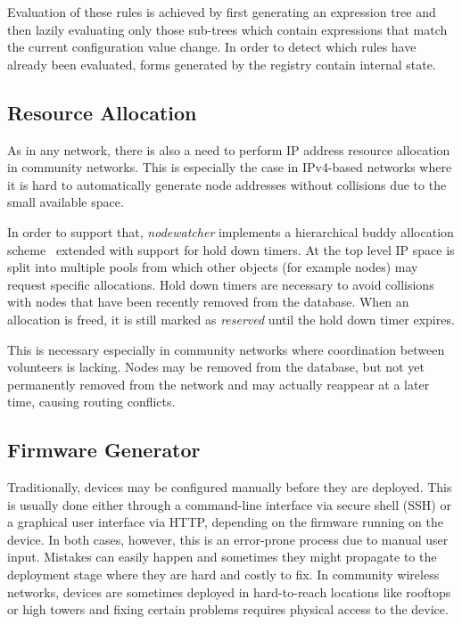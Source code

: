 \documentclass[5p,sort&compress]{elsarticle}
\newcommand{\nodewatcher}{\textit{nodewatcher}}
\begin{document}
Evaluation of these rules is achieved by first generating an expression tree and then lazily evaluating only those sub-trees which contain expressions that match the current configuration value change.
In order to detect which rules have already been evaluated, forms generated by the registry contain internal state.

\subsection{Resource Allocation}

As in any network, there is also a need to perform IP address resource allocation in community networks.
This is especially the case in IPv4-based networks where it is hard to automatically generate node addresses without collisions due to the small available space.

In order to support that, \nodewatcher{} implements a hierarchical buddy allocation scheme~\cite{Peterson_1977} extended with support for hold down timers.
At the top level IP space is split into multiple pools from which other objects (for example nodes) may request specific allocations.
Hold down timers are necessary to avoid collisions with nodes that have been recently removed from the database.
When an allocation is freed, it is still marked as \textit{reserved} until the hold down timer expires.

This is necessary especially in community networks where coordination between volunteers is lacking.
Nodes may be removed from the database, but not yet permanently removed from the network and may actually reappear at a later time, causing routing conflicts.

\subsection{Firmware Generator}
\label{sec:firmware-generator}

Traditionally, devices may be configured manually before they are deployed.
This is usually done either through a command-line interface via secure shell (SSH) or a graphical user interface via HTTP, depending on the firmware running on the device.
In both cases, however, this is an error-prone process due to manual user input.
Mistakes can easily happen and sometimes they might propagate to the deployment stage where they are hard and costly to fix.
In community wireless networks, devices are sometimes deployed in hard-to-reach locations like rooftops or high towers and fixing certain problems requires physical access to the device.
\end{document}
